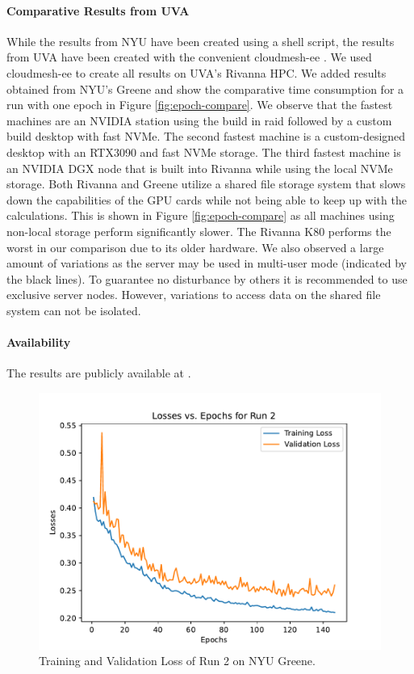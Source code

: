 \documentclass[sigplan,screen]{acmart}
\begin{document}
\paragraph{Comparative Results from UVA} While the results from NYU have been created using a shell script, the results from UVA have been created with the convenient cloudmesh-ee \cite{las-2023-ai-workflow,github-cloudmesh-ee}. We used cloudmesh-ee to create all results on UVA's Rivanna HPC. We added results obtained from NYU's Greene and show the comparative time consumption for a run with one epoch in Figure \ref{fig:epoch-compare}. We observe that the fastest machines are an NVIDIA station using the build in raid followed by a custom build desktop with fast NVMe. 
The second fastest machine is a custom-designed desktop with an RTX3090 and fast NVMe storage.
The third fastest machine is an NVIDIA DGX node that is built into Rivanna while using the local NVMe storage. 
Both Rivanna and Greene utilize a shared file storage system that slows down the capabilities of the GPU cards while not being able to keep up with the calculations. This is shown in Figure \ref{fig:epoch-compare} as all machines using non-local storage perform significantly slower.
The Rivanna K80 performs the worst in our comparison due to its older hardware.
We also observed a large amount of variations as the server may be used in multi-user mode (indicated by the black lines). To guarantee no disturbance by others it is recommended to use exclusive server nodes. However, variations to access data on the shared file system can not be isolated.

\paragraph{Availability} The results are publicly available at \cite{www-mlcommons-cloudmask-results}.


\begin{figure}[htb]
\centering\includegraphics[width=1.0\columnwidth]{images/epoch_vs_loss (2).pdf}
\caption{Training and Validation Loss of Run 2 on NYU Greene.}
\label{fig:Losses of Run 2}
\end{figure}
\end{document}
